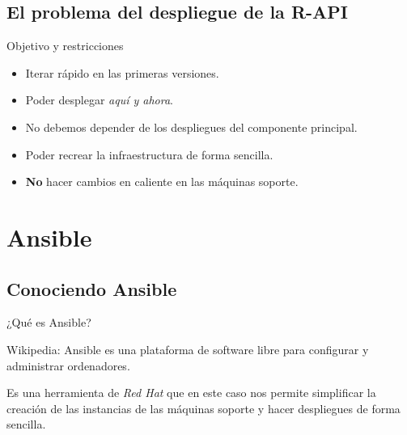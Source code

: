 \documentclass[12pt, aspectratio=169]{beamer} %
\begin{document}
\subsection{El problema del despliegue de la R-API}

\begin{frame}{Objetivo y restricciones}
  \begin{itemize}
  \item Iterar rápido en las primeras versiones.
  \item Poder desplegar \textit{aquí y ahora}.
  \item No debemos depender de los despliegues del componente principal.
  \item Poder recrear la infraestructura de forma sencilla.
  \item \textbf{No} hacer cambios en caliente en las máquinas soporte.
  \end{itemize}
  
\end{frame}

\section{Ansible}

\subsection{Conociendo Ansible}

\begin{frame}{¿Qué es Ansible?}
  \begin{block}{Wikipedia:}
    Ansible es una plataforma de software libre para configurar y administrar ordenadores.
  \end{block}

  Es una herramienta de \textit{Red Hat} que en este caso nos permite simplificar la creación de las instancias de las máquinas soporte y hacer despliegues de forma sencilla.
\end{frame}
\end{document}
